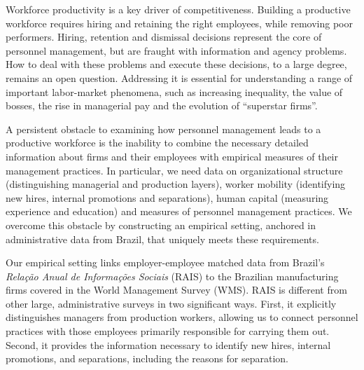 Workforce productivity is a key driver of competitiveness. Building a productive workforce requires hiring and retaining the right employees, while removing poor performers. Hiring, retention and dismissal decisions represent the core of personnel management, but are fraught with information and agency problems. How to deal with these problems and execute these decisions, to a large degree, remains an open question. Addressing it is essential for understanding a range of important labor-market phenomena, such as increasing inequality, the value of bosses, the rise in managerial pay and the evolution of ``superstar firms''.


A persistent obstacle to examining how personnel management leads to a productive workforce is the inability to combine the necessary detailed information about firms and their employees with empirical measures of their management practices. In particular, we need data on organizational structure (distinguishing managerial and production layers), worker mobility (identifying new hires, internal promotions and separations), human capital (measuring experience and education) and measures of personnel management practices. We overcome this obstacle by constructing an empirical setting, anchored in administrative data from Brazil, that uniquely meets these requirements.

Our empirical setting links employer-employee matched data from Brazil's \emph{Rela\c{c}\~{a}o Anual de Informa\c{c}\~{o}es Sociais} (RAIS) to the Brazilian manufacturing firms covered in the World Management Survey (WMS). RAIS is different from other large, administrative surveys in two significant ways. First, it explicitly distinguishes managers from production workers, allowing us to connect personnel practices with those employees primarily responsible for carrying them out. Second, it provides the information necessary to identify new hires, internal promotions, and separations, including the reasons for separation. 

